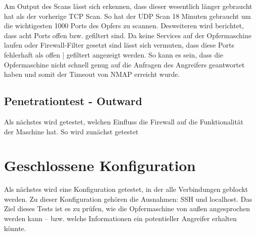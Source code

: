 

Am Output des Scans lässt sich erkennen, dass dieser wesentlich länger gebraucht hat als der vorherige TCP Scan. So hat der UDP Scan 18 Minuten gebraucht um die wichtigesten 1000 Ports des Opfers zu scannen. Desweiteren wird berichtet, dass acht Ports offen bzw. gefiltert sind. Da keine Services auf der Opfermaschine laufen oder Firewall-Filter gesetzt sind lässt sich vermuten, dass diese Ports fehlerhaft als offen | gefiltert angezeigt werden. So kann es sein, dass die Opfermaschine nicht schnell genug auf die Anfragen des Angreifers geantwortet haben und somit der Timeout von NMAP erreicht wurde. 

\subsection{Penetrationtest - Outward}
Als nächstes wird getestet, welchen Einfluss die Firewall auf die Funktionalität der Maschine hat. So wird zunächst getestet 
\section{Geschlossene Konfiguration}
Als nächstes wird eine Konfiguration getestet, in der alle Verbindungen geblockt werden. Zu dieser Konfiguration gehören die Ausnahmen: SSH und localhost. Das Ziel dieses Tests ist es zu prüfen, wie die Opfermaschine von außen angesprochen werden kann – bzw. welche Informationen ein potentieller Angreifer erhalten könnte.
 
